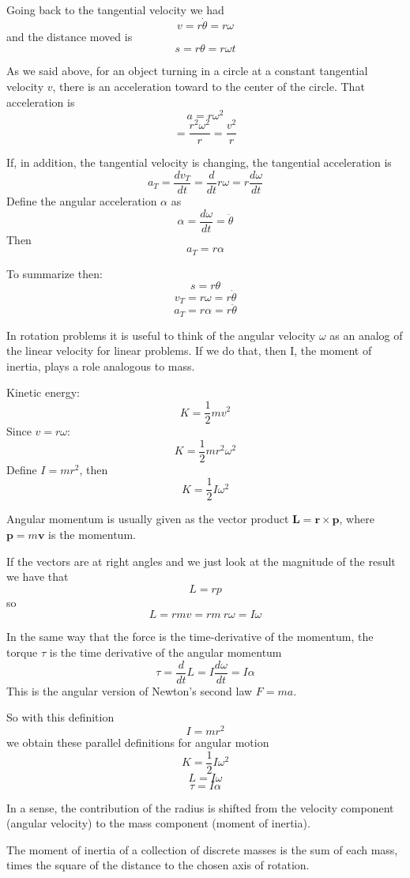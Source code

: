 \documentclass[11pt, oneside]{article}
\begin{document}
Going back to the tangential velocity we had
\[ v = r \dot{\theta} = r \omega \]
and the distance moved is
\[ s = r \theta = r \omega t \]

As we said above, for an object turning in a circle at a constant tangential velocity $v$, there is an acceleration toward to the center of the circle.  That acceleration is
\[ a = r \omega^2  \]
\[ = \frac{r^2 \omega^2}{r} = \frac{v^2}{r} \]

If, in addition, the tangential velocity is changing, the tangential acceleration is
\[ a_T = \frac{dv_T}{dt} = \frac{d}{dt} r \omega = r \frac{d \omega}{dt}  \]
Define the angular acceleration $\alpha$ as
\[ \alpha = \frac{d\omega}{dt} =  \ddot{\theta}  \]
Then 
\[ a_T = r \alpha \]

To summarize then:
\[ s = r \theta \]
\[ v_T = r \omega = r \dot{\theta} \]
\[ a_T = r \alpha = r \ddot{\theta} \]

In rotation problems it is useful to think of the angular velocity $\omega$ as an analog of the linear velocity for linear problems.  If we do that, then I, the moment of inertia, plays a role analogous to mass.

Kinetic energy:
\[ K = \frac{1}{2} mv^2 \]
Since $v = r \omega$:
\[ K =  \frac{1}{2} m r^2 \omega^2 \]
Define $I = mr^2$, then
\[ K = \frac{1}{2} I \omega^2 \]

Angular momentum is usually given as the vector product $\mathbf{L} = \mathbf{r} \times \mathbf{p}$, where $\mathbf{p} = m \mathbf{v}$ is the momentum.

If the vectors are at right angles and we just look at the magnitude of the result we have that
\[ L = rp \]
so
\[ L = r mv = r m \ r \omega = I \omega \]

In the same way that the force is the time-derivative of the momentum, the torque $\tau$ is the time derivative of the angular momentum
\[ \tau = \frac{d}{dt} L = I \frac{d \omega}{dt} = I \alpha \]
This is the angular version of Newton's second law $F = ma$.

So with this definition
\[ I = mr^2 \]
we obtain these parallel definitions for angular motion
\[ K = \frac{1}{2} I \omega^2 \]
\[ L = I \omega \]
\[ \tau = I \alpha \]

In a sense, the contribution of the radius is shifted from the velocity component (angular velocity) to the mass component (moment of inertia).

The moment of inertia of a collection of discrete masses is the sum of each mass, times the square of the distance to the chosen axis of rotation.  
\end{document}
